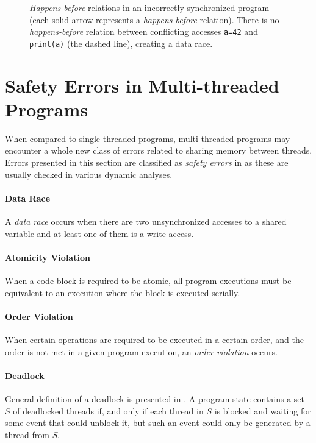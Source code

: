 \begin{figure}[hbt]
    \label{hb2}
    
    \caption{\emph{Happens-before} relations in an incorrectly synchronized
    program (each solid arrow represents a \emph{happens-before} relation).
    There is no \emph{happens-before} relation between conflicting accesses
    \texttt{a=42} and \texttt{print(a)} (the dashed line), creating a data
    race.}
\end{figure}


\section{Safety Errors in Multi-threaded Programs}

When compared to single-threaded programs, multi-threaded programs may encounter
a whole new class of errors related to sharing memory between threads. Errors
presented in this section are classified as \emph{safety errors} in \cite{letko}
as these are usually checked in various dynamic analyses.

\paragraph{Data Race}
A \emph{data race} occurs when there are two unsynchronized accesses to a shared
variable and at least one of them is a write access.

\paragraph{Atomicity Violation}
When a code block is required to be atomic, all
program executions must be equivalent to an execution where the block is
executed serially.

\paragraph{Order Violation}
When certain operations are required to be executed
in a certain order, and the order is not met in a given program execution, an
\emph{order violation} occurs.

\paragraph{Deadlock}
General definition of a deadlock is presented in
\cite{letko}. A program state contains a set $S$ of deadlocked threads if, and
only if each thread in $S$ is blocked and waiting for some event that could
unblock it, but such an event could only be generated by a thread from $S$.

